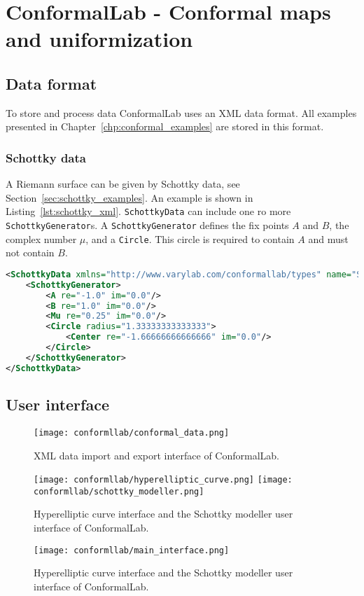 \documentclass[Thesis.tex]{subfiles}
\begin{document}
\chapter{{\sc ConformalLab} - Conformal maps and uniformization}
\label{chp:conformallab}

\section{Data format}
To store and process data {\sc ConformalLab} uses an {\sc XML} data format.
All examples presented in Chapter~\ref{chp:conformal_examples} are stored
in this format. 


\subsection{Schottky data} 


A Riemann surface can be given by Schottky data, see Section~\ref{sec:schottky_examples}. An example is shown in Listing~\ref{lst:schottky_xml}. {\tt SchottkyData} can include one ro more {\tt SchottkyGenerator}s. A {\tt SchottkyGenerator} defines the fix points $A$ and $B$, the complex number $\mu$, and a {\tt Circle}. This circle is required to contain $A$ and must not contain $B$.

\begin{lstlisting}[label=lst:schottky_xml, caption={Schotty data}, numbers=none, language=XML, captionpos=b]
<SchottkyData xmlns="http://www.varylab.com/conformallab/types" name="Schottky">
    <SchottkyGenerator>
        <A re="-1.0" im="0.0"/>
        <B re="1.0" im="0.0"/>
        <Mu re="0.25" im="0.0"/>
        <Circle radius="1.33333333333333">
            <Center re="-1.66666666666666" im="0.0"/>
        </Circle>
    </SchottkyGenerator>
</SchottkyData>
\end{lstlisting}


\section{User interface}
\begin{figure}
\centering
\texttt{[image: conformllab/conformal\_data.png]}
\caption{XML data import and export interface of {\sc ConformalLab}.}
\label{fig:conformal_data}
\end{figure}

\begin{figure}
\centering
\texttt{[image: conformllab/hyperelliptic\_curve.png]}
\texttt{[image: conformllab/schottky\_modeller.png]}
\caption{Hyperelliptic curve interface and the Schottky modeller user interface
of {\sc ConformalLab}.}
\label{fig:conformal_data}
\end{figure}

\begin{figure}
\centering
\texttt{[image: conformllab/main\_interface.png]}
\caption{Hyperelliptic curve interface and the Schottky modeller user interface
of {\sc ConformalLab}.}
\label{fig:conformal_data}
\end{figure}



\subfilebibliography
\end{document}
